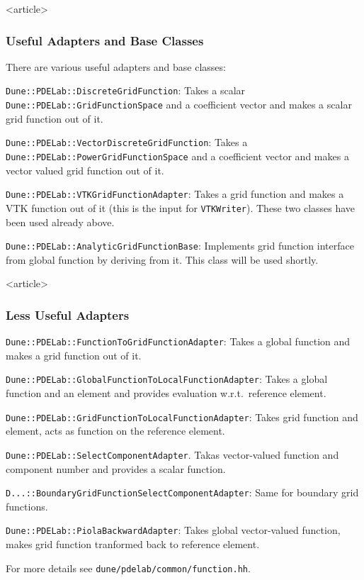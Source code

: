 \begin{frame}<article>
\frametitle{Useful Adapters and Base Classes}
There are various useful adapters and base classes:

\lstinline{Dune::PDELab::DiscreteGridFunction}: Takes a scalar
\lstinline{Dune::PDELab::GridFunctionSpace}
and a coefficient vector and makes a scalar grid function out
of it.

\lstinline{Dune::PDELab::VectorDiscreteGridFunction}: Takes a 
\lstinline{Dune::PDELab::PowerGridFunctionSpace}
and a coefficient vector and makes a vector valued grid function out
of it.

\lstinline{Dune::PDELab::VTKGridFunctionAdapter}: Takes a grid
function and makes a VTK function out of it (this is the input
for \lstinline{VTKWriter}). These two classes have been used already above.

\lstinline{Dune::PDELab::AnalyticGridFunctionBase}: Implements
grid function interface from global function by deriving from it.
This class will be used shortly.

\end{frame}

\begin{frame}<article>
\frametitle{Less Useful Adapters}
\lstinline{Dune::PDELab::FunctionToGridFunctionAdapter}: Takes a global
function and makes a grid function out of it.

\lstinline{Dune::PDELab::GlobalFunctionToLocalFunctionAdapter}:
Takes a global function and an element and provides evaluation
w.r.t.~reference element.

\lstinline{Dune::PDELab::GridFunctionToLocalFunctionAdapter}:
Takes grid function and element, acts as function on the
reference element.

\lstinline{Dune::PDELab::SelectComponentAdapter}. Takas
vector-valued function and component number and provides a scalar function.

\lstinline{D...::BoundaryGridFunctionSelectComponentAdapter}:
Same for boundary grid functions.

\lstinline{Dune::PDELab::PiolaBackwardAdapter}: Takes global
vector-valued function, makes grid function tranformed back to
reference element.

For more details see \lstinline{dune/pdelab/common/function.hh}.
\end{frame}

%

